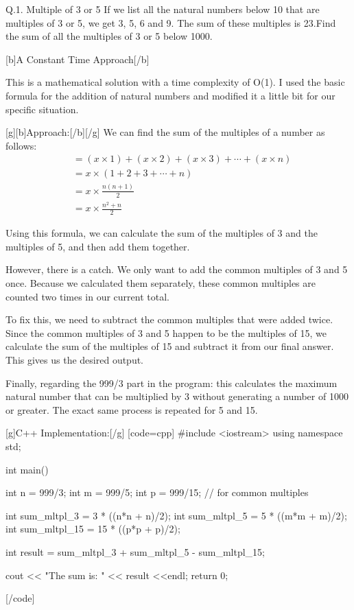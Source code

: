 Q.1. Multiple of 3 or 5
   If we list all the natural numbers below 10 that are multiples of 3 or 5, we get 3, 5, 6 and 9. The sum of these multiples is 23.Find the sum of all the multiples of 3 or 5 below 1000.


[b]A Constant Time Approach[/b]

This is a mathematical solution with a time complexity of O(1). I used the basic formula for the addition of natural numbers and modified it a little bit for our specific situation.

[g][b]Approach:[/b][/g]
We can find the sum of the multiples of a number as follows:
$$
\begin{aligned}
&= (x\times1) + (x\times2) + (x\times3) + \cdots + (x\times n) \\
&= x\times(1+2+3+\cdots+n) \\
&= x\times\frac{n(n+1)}{2} \\
&= x\times\frac{n^2+n}{2}
\end{aligned}
$$

Using this formula, we can calculate the sum of the multiples of 3 and the multiples of 5, and then add them together. 

However, there is a catch. We only want to add the common multiples of 3 and 5 once. Because we calculated them separately, these common multiples are counted two times in our current total. 

To fix this, we need to subtract the common multiples that were added twice. Since the common multiples of 3 and 5 happen to be the multiples of 15, we calculate the sum of the multiples of 15 and subtract it from our final answer. This gives us the desired output.

Finally, regarding the 999/3 part in the program: this calculates the maximum natural number that can be multiplied by 3 without generating a number of 1000 or greater. The exact same process is repeated for 5 and 15.

[g]C++ Implementation:[/g]
[code=cpp]
#include <iostream>
using namespace std;

int main()
{
    int n = 999/3;
    int m = 999/5;
    int p = 999/15;    // for common multiples

    int sum_mltpl_3 = 3 * ((n*n + n)/2);
    int sum_mltpl_5 = 5 * ((m*m + m)/2);
    int sum_mltpl_15 = 15 * ((p*p + p)/2);

    int result = sum_mltpl_3 + sum_mltpl_5 - sum_mltpl_15;

    cout << "The sum is: " << result <<endl;
    return 0;
}
[/code]